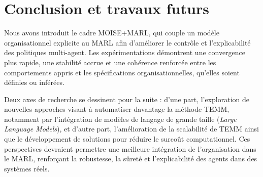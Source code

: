 \documentclass[francais,ROIA,Unicode,manuscript]{cedram}
\begin{document}
\section{Conclusion et travaux futurs}
\label{sec:discussion_conclusion_future_work}

Nous avons introduit le cadre MOISE+MARL, qui couple un modèle organisationnel explicite au MARL afin d'améliorer le contrôle et l'explicabilité des politiques multi-agent. Les expérimentations démontrent une convergence plus rapide, une stabilité accrue et une cohérence renforcée entre les comportements appris et les spécifications organisationnelles, qu'elles soient définies ou inférées.

Deux axes de recherche se dessinent pour la suite : d'une part, l'exploration de nouvelles approches visant à automatiser davantage la méthode TEMM, notamment par l'intégration de modèles de langage de grande taille (\textit{Large Language Models}), et d'autre part, l'amélioration de la scalabilité de TEMM ainsi que le développement de solutions pour réduire le surcoût computationnel. Ces perspectives devraient permettre une meilleure intégration de l'organisation dans le MARL, renforçant la robustesse, la sûreté et l'explicabilité des agents dans des systèmes réels.

\newpage


\bigskip

\setotherabstracts
\end{document}
